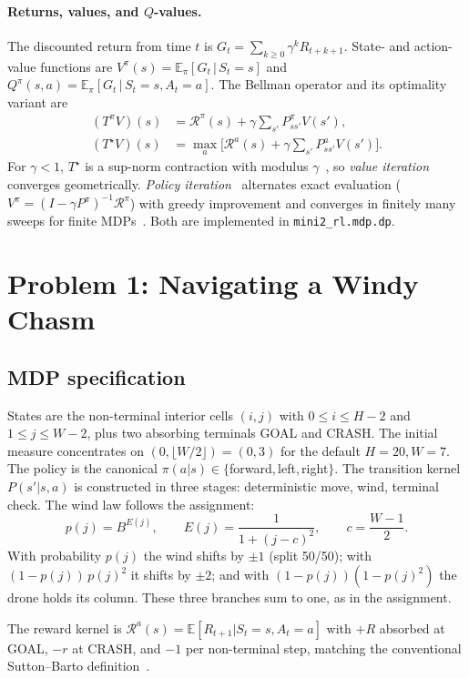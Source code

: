 \documentclass[11pt,letterpaper]{article}
\newcommand{\E}{\mathbb{E}}
\newcommand{\calR}{\mathcal{R}}
\begin{document}
\paragraph{Returns, values, and $Q$-values.}
The discounted return from time $t$ is $G_{t}=\sum_{k\ge 0}\gamma^{k} R_{t+k+1}$. State- and action-value functions are $V^{\pi}(s)=\E_{\pi}[G_{t}\,|\,S_{t}=s]$ and $Q^{\pi}(s,a)=\E_{\pi}[G_{t}\,|\,S_{t}=s,A_{t}=a]$. The Bellman operator and its optimality variant are
\begin{align*}
(T^{\pi}V)(s) &= \calR^{\pi}(s) + \gamma\!\!\sum_{s'}\!P^{\pi}_{ss'}V(s'),\\
(T^{\star} V)(s) &= \max_{a}\bigl[\calR^{a}(s)+\gamma\!\!\sum_{s'}\!P^{a}_{ss'}V(s')\bigr].
\end{align*}
For $\gamma<1$, $T^{\star}$ is a sup-norm contraction with modulus $\gamma$~\cite{banach1922operations,bertsekas1996neuro}, so \emph{value iteration} converges geometrically. \emph{Policy iteration}~\cite{howard1960dynamic} alternates exact evaluation ($V^{\pi}=(I-\gamma P^{\pi})^{-1}\calR^{\pi}$) with greedy improvement and converges in finitely many sweeps for finite MDPs~\cite{puterman1994markov,sutton2018reinforcement}. Both are implemented in \texttt{mini2\_rl.mdp.dp}.

\section{Problem 1: Navigating a Windy Chasm}\label{sec:p1}
\subsection{MDP specification}
States are the non-terminal interior cells $(i,j)$ with $0\le i\le H-2$ and $1\le j\le W-2$, plus two absorbing terminals \textsc{GOAL} and \textsc{CRASH}. The initial measure concentrates on $(0, \lfloor W/2\rfloor)=(0,3)$ for the default $H=20,W=7$. The policy is the canonical $\pi(a|s)\in\{$forward,\,left,\,right$\}$. The transition kernel $P(s'|s,a)$ is constructed in three stages: deterministic move, wind, terminal check. The wind law follows the assignment:
\[
p(j) = B^{E(j)},\qquad E(j)=\frac{1}{1+(j-c)^{2}},\qquad c=\frac{W-1}{2}.
\]
With probability $p(j)$ the wind shifts by $\pm 1$ (split 50/50); with $(1-p(j))\,p(j)^{2}$ it shifts by $\pm 2$; and with $(1-p(j))(1-p(j)^{2})$ the drone holds its column. These three branches sum to one, as in the assignment.

The reward kernel is $\calR^{a}(s)=\E[R_{t+1}|S_{t}=s,A_{t}=a]$ with $+R$ absorbed at \textsc{GOAL}, $-r$ at \textsc{CRASH}, and $-1$ per non-terminal step, matching the conventional Sutton--Barto definition~\cite{sutton2018reinforcement}.
\end{document}
